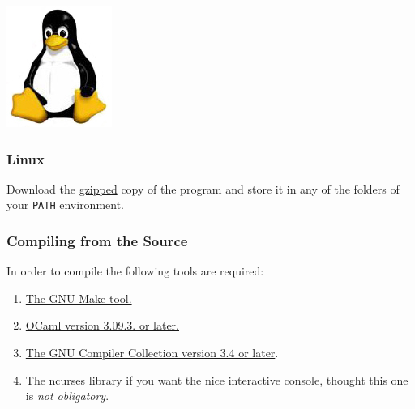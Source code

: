 \begin{flushleft}
	\begin{minipage}[c]{0.074\textwidth}
   		\includegraphics[width=\textwidth]{figures/figLogoLinux.jpg}
	\end{minipage}
	\quad
	\begin{minipage}[t]{0.88\textwidth}
	   	\subsubsection{Linux}
	\end{minipage}

    Download the 
    \href{http://research.amnh.org/scicomp/projects/poy.php}{gzipped} copy of
    the program and store it in any of the folders of your \texttt{PATH}
    environment. 
\end{flushleft}


\subsubsection{Compiling from the Source}

In order to compile \poy the following tools are required:

\begin{enumerate}
    \item \href{http://www.gnu.org/software/make/}{The GNU Make tool.}
    \item \href{http://www.ocaml.org}{OCaml version 3.09.3. or later.}
    \item \href{http://gcc.gnu.org/}{The GNU Compiler Collection version 3.4 or
        later}.
    \item \href{http://www.gnu.org/software/ncurses/}{The ncurses library} if
        you want the nice interactive console, thought this one is
        \emph{not obligatory}.
\end{enumerate}

